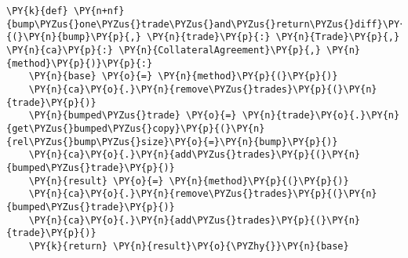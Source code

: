     \begin{tcolorbox}[breakable, size=fbox, boxrule=1pt, pad at break*=1mm,colback=cellbackground, colframe=cellborder]
\begin{Verbatim}[commandchars=\\\{\}]
\PY{k}{def} \PY{n+nf}{bump\PYZus{}one\PYZus{}trade\PYZus{}and\PYZus{}return\PYZus{}diff}\PY{p}{(}\PY{n}{bump}\PY{p}{,} \PY{n}{trade}\PY{p}{:} \PY{n}{Trade}\PY{p}{,} \PY{n}{ca}\PY{p}{:} \PY{n}{CollateralAgreement}\PY{p}{,} \PY{n}{method}\PY{p}{)}\PY{p}{:}
    \PY{n}{base} \PY{o}{=} \PY{n}{method}\PY{p}{(}\PY{p}{)}
    \PY{n}{ca}\PY{o}{.}\PY{n}{remove\PYZus{}trades}\PY{p}{(}\PY{n}{trade}\PY{p}{)}
    \PY{n}{bumped\PYZus{}trade} \PY{o}{=} \PY{n}{trade}\PY{o}{.}\PY{n}{get\PYZus{}bumped\PYZus{}copy}\PY{p}{(}\PY{n}{rel\PYZus{}bump\PYZus{}size}\PY{o}{=}\PY{n}{bump}\PY{p}{)}
    \PY{n}{ca}\PY{o}{.}\PY{n}{add\PYZus{}trades}\PY{p}{(}\PY{n}{bumped\PYZus{}trade}\PY{p}{)}
    \PY{n}{result} \PY{o}{=} \PY{n}{method}\PY{p}{(}\PY{p}{)}
    \PY{n}{ca}\PY{o}{.}\PY{n}{remove\PYZus{}trades}\PY{p}{(}\PY{n}{bumped\PYZus{}trade}\PY{p}{)}
    \PY{n}{ca}\PY{o}{.}\PY{n}{add\PYZus{}trades}\PY{p}{(}\PY{n}{trade}\PY{p}{)}
    \PY{k}{return} \PY{n}{result}\PY{o}{\PYZhy{}}\PY{n}{base}
\end{Verbatim}
\end{tcolorbox}

